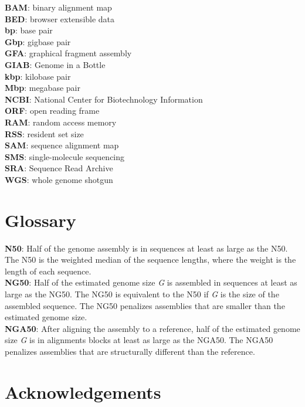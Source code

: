 \documentclass[
  12pt,
  oneside,
  openany]{book}
\begin{document}
\textbf{BAM}: binary alignment map\\
\textbf{BED}: browser extensible data\\
\textbf{bp}: base pair\\
\textbf{Gbp}: gigbase pair\\
\textbf{GFA}: graphical fragment assembly\\
\textbf{GIAB}: Genome in a Bottle\\
\textbf{kbp}: kilobase pair\\
\textbf{Mbp}: megabase pair\\
\textbf{NCBI}: National Center for Biotechnology Information\\
\textbf{ORF}: open reading frame\\
\textbf{RAM}: random access memory\\
\textbf{RSS}: resident set size\\
\textbf{SAM}: sequence alignment map\\
\textbf{SMS}: single-molecule sequencing\\
\textbf{SRA}: Sequence Read Archive\\
\textbf{WGS}: whole genome shotgun

\newpage

\hypertarget{glossary}{%
\section{Glossary}\label{glossary}}

\textbf{N50}: Half of the genome assembly is in sequences at least as large as the N50. The N50 is the weighted median of the sequence lengths, where the weight is the length of each sequence.\\
\textbf{NG50}: Half of the estimated genome size \emph{G} is assembled in sequences at least as large as the NG50. The NG50 is equivalent to the N50 if \emph{G} is the size of the assembled sequence. The NG50 penalizes assemblies that are smaller than the estimated genome size.\\
\textbf{NGA50}: After aligning the assembly to a reference, half of the estimated genome size \emph{G} is in alignments blocks at least as large as the NGA50. The NGA50 penalizes assemblies that are structurally different than the reference.

\newpage

\hypertarget{acknowledgements}{%
\section{Acknowledgements}\label{acknowledgements}}
\end{document}
